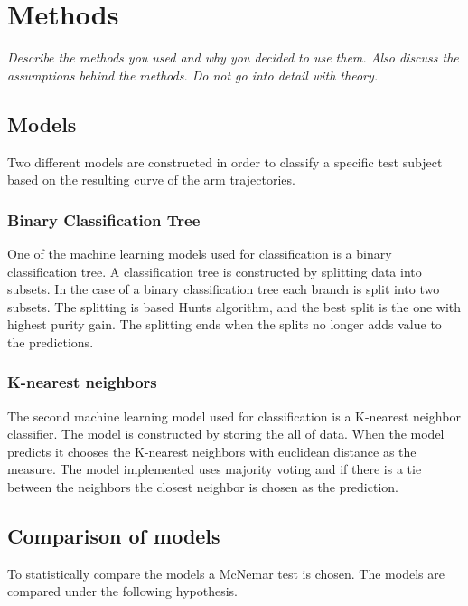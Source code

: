 \documentclass[11pt, fleqn, titlepage]{article}
\begin{document}
\section{Methods}
\textit{Describe the methods you used and why you decided to use them. Also discuss the assumptions behind the methods. Do not go into detail with theory.}

\subsection*{Models}
Two different models are constructed in order to classify a specific test subject based on the resulting curve of the arm trajectories. 

\subsubsection*{Binary Classification Tree}
One of the machine learning models used for classification is a binary classification tree. A classification tree is constructed by splitting data into subsets. In the case of a binary classification tree each branch is split into two subsets. The splitting is based Hunts algorithm, and the best split is the one with highest purity gain. The splitting ends when the splits no longer adds value to the predictions. 

\subsubsection*{K-nearest neighbors}
The second machine learning model used for classification is a K-nearest neighbor classifier. The model is constructed by storing the all of data. When the model predicts it chooses the K-nearest neighbors with euclidean distance as the measure. The model implemented uses majority voting and if there is a tie between the neighbors the closest neighbor is chosen as the prediction. 

\subsection*{Comparison of models}
To statistically compare the models a McNemar test is chosen. The models are compared under the following hypothesis. 
\end{document}
